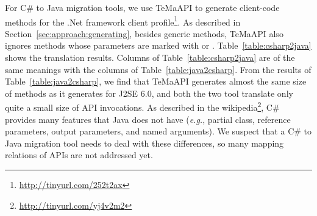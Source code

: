 For C\# to Java migration tools, we use TeMaAPI to generate client-code methods for the .Net framework client profile\footnote{\url{http://tinyurl.com/252t2ax}}. As described in Section~\ref{sec:approach:generating}, besides generic methods, TeMaAPI also ignores methods whose parameters are marked with  or . Table~\ref{table:csharp2java} shows the translation results. Columns of Table~\ref{table:csharp2java} are of the same meanings with the columns of Table~\ref{table:java2csharp}. From the results of Table~\ref{table:java2csharp}, we find that TeMaAPI generates almost the same size of methods as it generates for J2SE 6.0, and both the two tool translate only quite a small size of API invocations. As described in the wikipedia\footnote{\url{http://tinyurl.com/yj4v2m2}}, C\# provides many features that Java does not have (\emph{e.g.}, partial class, reference parameters, output parameters, and named arguments). We suspect that a C\# to Java migration tool needs to deal with these differences, so many mapping relations of APIs are not addressed yet. 
